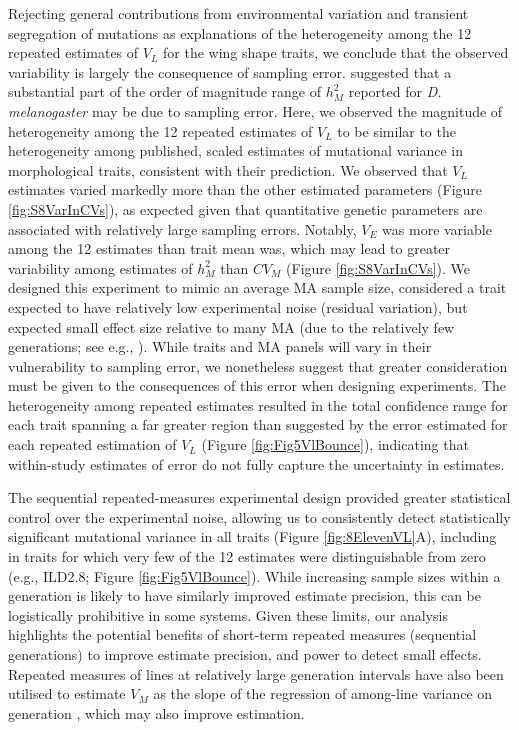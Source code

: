 Rejecting general contributions from environmental variation and transient segregation of mutations as explanations of the heterogeneity among the 12 repeated estimates of $V_L$ for the wing shape traits, we conclude that the observed variability is largely the consequence of sampling error. \citet{Lync99} suggested that a substantial part of the order of magnitude range of $h_M^2$ reported for \textit{D. melanogaster} may be due to sampling error. Here, we observed the magnitude of heterogeneity among the 12 repeated estimates of $V_L$ to be similar to the heterogeneity among published, scaled estimates of mutational variance in morphological traits, consistent with their prediction. We observed that $V_L$ estimates varied markedly more than the other estimated parameters (Figure \ref{fig:S8VarInCVs}), as expected given that quantitative genetic parameters are associated with relatively large sampling errors. Notably, $V_E$ was more variable among the 12 estimates than trait mean was, which may lead to greater variability among estimates of $h_M^2$ than $CV_M$ (Figure \ref{fig:S8VarInCVs}). We designed this experiment to mimic an average MA sample size, considered a trait expected to have relatively low experimental noise (residual variation), but expected small effect size relative to many MA (due to the relatively few generations; see e.g., \citealp{Vass00}). While traits and MA panels will vary in their vulnerability to sampling error, we nonetheless suggest that greater consideration must be given to the consequences of this error when designing experiments. The heterogeneity among repeated estimates resulted in the total confidence range for each trait spanning a far greater region than suggested by the error estimated for each repeated estimation of $V_L$ (Figure \ref{fig:Fig5VlBounce}), indicating that within-study estimates of error do not fully capture the uncertainty in estimates. \par

The sequential repeated-measures experimental design provided greater statistical control over the experimental noise, allowing us to consistently detect statistically significant mutational variance in all traits (Figure \ref{fig:8ElevenVL}A), including in traits for which very few of the 12 estimates were distinguishable from zero (e.g., ILD2.8; Figure \ref{fig:Fig5VlBounce}). While increasing sample sizes within a generation is likely to have similarly improved estimate precision, this can be logistically prohibitive in some systems. Given these limits, our analysis highlights the potential benefits of short-term repeated measures (sequential generations) to improve estimate precision, and power to detect small effects. Repeated measures of lines at relatively large generation intervals have also been utilised to estimate $V_M$ as the slope of the regression of among-line variance on generation \citep{Vass00,Houl04,McGu11a}, which may also improve estimation. \par

